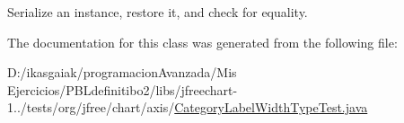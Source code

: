 Serialize an instance, restore it, and check for equality. 

The documentation for this class was generated from the following file\+:\begin{DoxyCompactItemize}
\item 
D\+:/ikasgaiak/programacion\+Avanzada/\+Mis Ejercicios/\+P\+B\+Ldefinitibo2/libs/jfreechart-\/1../tests/org/jfree/chart/axis/\mbox{\hyperlink{_category_label_width_type_test_8java}{Category\+Label\+Width\+Type\+Test.\+java}}\end{DoxyCompactItemize}
